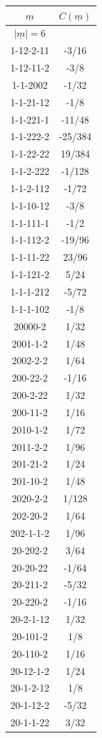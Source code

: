 \begin{tabular}[t]{|cc|}
\hline
$\underline{m}$ & $C(\underline{m})$\\
\hline\hline
$|\underline{m}|=6$&\\
\hline
1-12-2-11 &  -3/16\\
1-12-11-2 &  -3/8\\
1-1-2002 &  -1/32\\
1-1-21-12 &  -1/8\\
1-1-221-1 &  -11/48\\
1-1-222-2 &  -25/384\\
1-1-22-22 &  19/384\\
1-1-2-222 &  -1/128\\
1-1-2-112 &  -1/72\\
1-1-10-12 &  -3/8\\
1-1-111-1 &  -1/2\\
1-1-112-2 &  -19/96\\
1-1-11-22 &  23/96\\
1-1-121-2 &  5/24\\
1-1-1-212 &  -5/72\\
1-1-1-102 &  -1/8\\
20000-2 &  1/32\\
2001-1-2 &  1/48\\
2002-2-2 &  1/64\\
200-22-2 &  -1/16\\
200-2-22 &  1/32\\
200-11-2 &  1/16\\
2010-1-2 &  1/72\\
2011-2-2 &  1/96\\
201-21-2 &  1/24\\
201-10-2 &  1/48\\
2020-2-2 &  1/128\\
202-20-2 &  1/64\\
202-1-1-2 &  1/96\\
20-202-2 &  3/64\\
20-20-22 &  -1/64\\
20-211-2 &  -5/32\\
20-220-2 &  -1/16\\
20-2-1-12 &  1/32\\
20-101-2 &  1/8\\
20-110-2 &  1/16\\
20-12-1-2 &  1/24\\
20-1-2-12 &  1/8\\
20-1-12-2 &  -5/32\\
20-1-1-22 &  3/32\\

\end{tabular}
